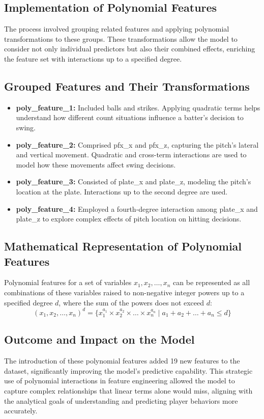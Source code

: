 \documentclass[12pt]{article}
\begin{document}
\subsection*{Implementation of Polynomial Features}
The process involved grouping related features and applying polynomial transformations to these groups. These transformations allow the model to consider not only individual predictors but also their combined effects, enriching the feature set with interactions up to a specified degree.

\subsection*{Grouped Features and Their Transformations}
\begin{itemize}
    \item \textbf{poly\_feature\_1:} Included balls and strikes. Applying quadratic terms helps understand how different count situations influence a batter's decision to swing.
    \item \textbf{poly\_feature\_2:} Comprised pfx\_x and pfx\_z, capturing the pitch’s lateral and vertical movement. Quadratic and cross-term interactions are used to model how these movements affect swing decisions.
    \item \textbf{poly\_feature\_3:} Consisted of plate\_x and plate\_z, modeling the pitch’s location at the plate. Interactions up to the second degree are used.
    \item \textbf{poly\_feature\_4:} Employed a fourth-degree interaction among plate\_x and plate\_z to explore complex effects of pitch location on hitting decisions.
\end{itemize}

\subsection*{Mathematical Representation of Polynomial Features}
Polynomial features for a set of variables \( x_1, x_2, \dots, x_n \) can be represented as all combinations of these variables raised to non-negative integer powers up to a specified degree \( d \), where the sum of the powers does not exceed \( d \):
\[
(x_1, x_2, \dots, x_n)^d = \{ x_1^{a_1} \times x_2^{a_2} \times \dots \times x_n^{a_n} \mid a_1 + a_2 + \dots + a_n \leq d \}
\]

\subsection*{Outcome and Impact on the Model}
The introduction of these polynomial features added 19 new features to the dataset, significantly improving the model’s predictive capability. This strategic use of polynomial interactions in feature engineering allowed the model to capture complex relationships that linear terms alone would miss, aligning with the analytical goals of understanding and predicting player behaviors more accurately.
\end{document}
